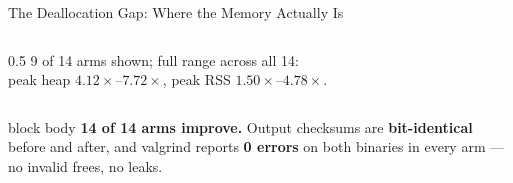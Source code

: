 \documentclass[10pt,aspectratio=169]{beamer}
\begin{document}
\begin{frame}{The Deallocation Gap: Where the Memory Actually Is}
\begin{columns}[T,totalwidth=0.99\textwidth]
\begin{column}{0.5\textwidth}
\vspace{0.15cm}
\footnotesize 9 of 14 arms shown; full range across all 14:\\
peak heap $4.12\times$--$7.72\times$, peak RSS $1.50\times$--$4.78\times$.
\end{column}
\end{columns}

\vspace{0.25cm}
\begin{beamercolorbox}[sep=0.4em,center,rounded=true,shadow=true]{block body}
\small
\textcolor{edgegreen}{\textbf{14 of 14 arms improve.}} Output checksums are
\textbf{bit-identical} before and after, and valgrind reports \textbf{0 errors}
on both binaries in every arm --- no invalid frees, no leaks.
\end{beamercolorbox}
\end{frame}
\end{document}
